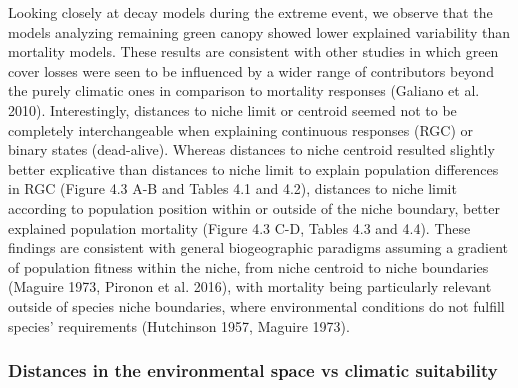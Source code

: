 \documentclass[11pt,twoside]{reedthesis}
\begin{document}
Looking closely at decay models during the extreme event, we observe
that the models analyzing remaining green canopy showed lower explained
variability than mortality models. These results are consistent with
other studies in which green cover losses were seen to be influenced by
a wider range of contributors beyond the purely climatic ones in
comparison to mortality responses (Galiano et al. 2010). Interestingly,
distances to niche limit or centroid seemed not to be completely
interchangeable when explaining continuous responses (RGC) or binary
states (dead-alive). Whereas distances to niche centroid resulted
slightly better explicative than distances to niche limit to explain
population differences in RGC (Figure 4.3 A-B and Tables 4.1 and 4.2),
distances to niche limit according to population position within or
outside of the niche boundary, better explained population mortality
(Figure 4.3 C-D, Tables 4.3 and 4.4). These findings are consistent with
general biogeographic paradigms assuming a gradient of population
fitness within the niche, from niche centroid to niche boundaries
(Maguire 1973, Pironon et al. 2016), with mortality being particularly
relevant outside of species niche boundaries, where environmental
conditions do not fulfill species' requirements (Hutchinson 1957,
Maguire 1973). \par

\subsubsection{Distances in the environmental space vs climatic
suitability}\label{distances-in-the-environmental-space-vs-climatic-suitability}
\end{document}
